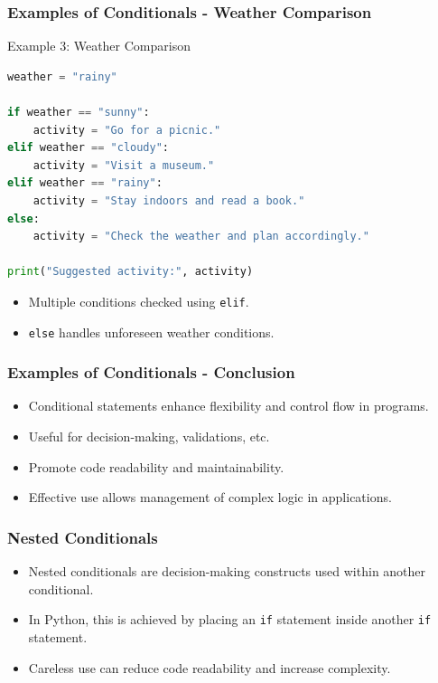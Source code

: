 \documentclass{beamer}
\begin{document}
\begin{frame}[fragile]
    \frametitle{Examples of Conditionals - Weather Comparison}
    \begin{block}{Example 3: Weather Comparison}
        \begin{lstlisting}[language=Python]
weather = "rainy"

if weather == "sunny":
    activity = "Go for a picnic."
elif weather == "cloudy":
    activity = "Visit a museum."
elif weather == "rainy":
    activity = "Stay indoors and read a book."
else:
    activity = "Check the weather and plan accordingly."

print("Suggested activity:", activity)
        \end{lstlisting}
    \end{block}
    \begin{itemize}
        \item Multiple conditions checked using \texttt{elif}.
        \item \texttt{else} handles unforeseen weather conditions.
    \end{itemize}
\end{frame}

\begin{frame}[fragile]
    \frametitle{Examples of Conditionals - Conclusion}
    \begin{itemize}
        \item Conditional statements enhance flexibility and control flow in programs.
        \item Useful for decision-making, validations, etc.
        \item Promote code readability and maintainability.
        \item Effective use allows management of complex logic in applications.
    \end{itemize}
\end{frame}

\begin{frame}
    \frametitle{Nested Conditionals}
    \begin{itemize}
        \item Nested conditionals are decision-making constructs used within another conditional.
        \item In Python, this is achieved by placing an \texttt{if} statement inside another \texttt{if} statement.
        \item Careless use can reduce code readability and increase complexity.
    \end{itemize}
\end{frame}
\end{document}
